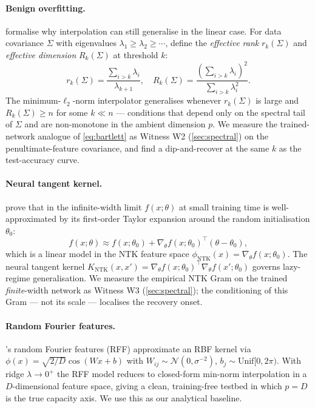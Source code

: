 \paragraph{Benign overfitting.} \citet{bartlett2020benign} formalise why interpolation can still generalise in the linear case. For data covariance $\Sigma$ with eigenvalues $\lambda_1 \ge \lambda_2 \ge \cdots$, define the \emph{effective rank} $r_k(\Sigma)$ and \emph{effective dimension} $R_k(\Sigma)$ at threshold $k$:
\begin{equation}
  \label{eq:bartlett}
  r_k(\Sigma) = \frac{\sum_{i>k}\lambda_i}{\lambda_{k+1}}, \quad
  R_k(\Sigma) = \frac{(\sum_{i>k}\lambda_i)^{2}}{\sum_{i>k}\lambda_i^{2}}.
\end{equation}
The minimum-$\ell_2$-norm interpolator generalises whenever $r_k(\Sigma)$ is large and $R_k(\Sigma) \ge n$ for some $k \ll n$ --- conditions that depend only on the spectral tail of $\Sigma$ and are non-monotone in the ambient dimension $p$. We measure the trained-network analogue of \cref{eq:bartlett} as Witness W2 (\cref{sec:spectral}) on the penultimate-feature covariance, and find a dip-and-recover at the same $k$ as the test-accuracy curve.

\paragraph{Neural tangent kernel.} \citet{jacot2018neural} prove that in the infinite-width limit $f(x;\theta)$ at small training time is well-approximated by its first-order Taylor expansion around the random initialisation $\theta_0$:
\begin{equation}
  \label{eq:ntk}
  f(x;\theta) \approx f(x;\theta_0) + \nabla_\theta f(x;\theta_0)^\top(\theta - \theta_0),
\end{equation}
which is a linear model in the NTK feature space $\phi_{\mathrm{NTK}}(x) = \nabla_\theta f(x;\theta_0)$. The neural tangent kernel $K_{\mathrm{NTK}}(x,x') = \nabla_\theta f(x;\theta_0)^\top \nabla_\theta f(x';\theta_0)$ governs lazy-regime generalisation. We measure the empirical NTK Gram on the trained \emph{finite}-width network as Witness W3 (\cref{sec:spectral}); the conditioning of this Gram --- not its scale --- localises the recovery onset.

\paragraph{Random Fourier features.} \citet{rahimi2007random}'s random Fourier features (RFF) approximate an RBF kernel via $\phi(x) = \sqrt{2/D}\cos(Wx+b)$ with $W_{ij}\sim\mathcal{N}(0,\sigma^{-2})$, $b_j\sim\mathrm{Unif}[0,2\pi)$. With ridge $\lambda\to0^+$ the RFF model reduces to closed-form min-norm interpolation in a $D$-dimensional feature space, giving a clean, training-free testbed in which $p=D$ is the true capacity axis. We use this as our analytical baseline.

